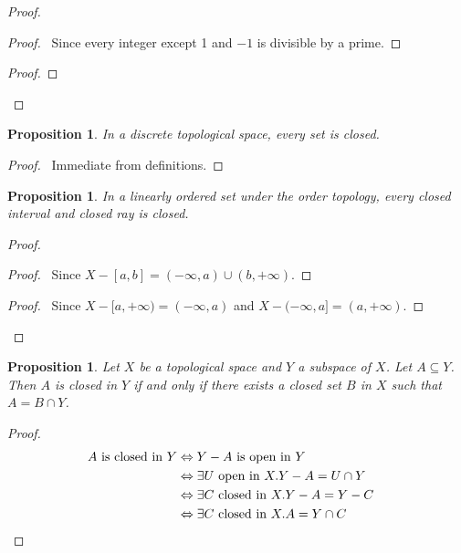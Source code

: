 \documentclass{book}
\let\qed\relax
\newtheorem{prop}[ax]{Proposition}
\theoremstyle{definition}
\begin{document}
\begin{proof}
\begin{proof}
	\pf\ Since every integer except 1 and $-1$ is divisible by a prime.
\end{proof}
\begin{proof}
\end{proof}
\qed
\end{proof}

\begin{prop}
In a discrete topological space, every set is closed.
\end{prop}

\begin{proof}
\pf\ Immediate from definitions. \qed
\end{proof}

\begin{prop}
In a linearly ordered set under the order topology, every closed interval and closed ray is closed.
\end{prop}

\begin{proof}
\pf
{}
\begin{proof}
	\pf\ Since $X - [a,b] = (-\infty, a) \cup (b, +\infty)$.
\end{proof}
\begin{proof}
	\pf\ Since $X - [a,+\infty) = (-\infty,a)$ and $X - (-\infty,a] = (a,+\infty)$.
\end{proof}
\qed
\end{proof}

\begin{prop}
Let $X$ be a topological space and $Y$ a subspace of $X$. Let $A \subseteq Y$. Then $A$ is closed in $Y$ if and only if there exists a closed set $B$ in $X$ such that $A = B \cap Y$.
\end{prop}

\begin{proof}
\pf
\begin{align*}
A \text{ is closed in } Y & \Leftrightarrow Y - A \text{ is open in } Y \\
& \Leftrightarrow \exists U \text{ open in } X. Y - A = U \cap Y \\
& \Leftrightarrow \exists C \text{ closed in } X. Y - A = Y - C \\
& \Leftrightarrow \exists C \text{ closed in } X. A = Y \cap C & \qed
\end{align*}
\end{proof}
\end{document}
